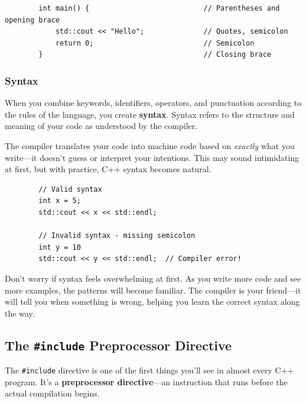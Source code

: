 \begin{example}{\leavevmode}
	
	\begin{lstlisting}
		int main() {                           // Parentheses and opening brace
			std::cout << "Hello";              // Quotes, semicolon
			return 0;                          // Semicolon
		}                                      // Closing brace
	\end{lstlisting}
\end{example}

\subsubsection{Syntax}

When you combine keywords, identifiers, operators, and punctuation according to the rules of the language, you create \textbf{syntax}. Syntax refers to the structure and meaning of your code as understood by the compiler.

The compiler translates your code into machine code based on \textit{exactly} what you write—it doesn't guess or interpret your intentions. This may sound intimidating at first, but with practice, C++ syntax becomes natural.

\begin{example}{\leavevmode}
	
	\begin{lstlisting}
		// Valid syntax
		int x = 5;
		std::cout << x << std::endl;
		
		// Invalid syntax - missing semicolon
		int y = 10
		std::cout << y << std::endl;  // Compiler error!
	\end{lstlisting}
\end{example}

\begin{remark}
	Don't worry if syntax feels overwhelming at first. As you write more code and see more examples, the patterns will become familiar. The compiler is your friend—it will tell you when something is wrong, helping you learn the correct syntax along the way.
\end{remark}

\subsection{The \texttt{\#include} Preprocessor Directive}

The \texttt{\#include} directive is one of the first things you'll see in almost every C++ program. It's a \textbf{preprocessor directive}—an instruction that runs before the actual compilation begins.

